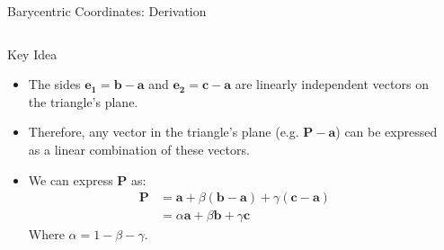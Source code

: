\begin{frame}{Barycentric Coordinates: Derivation}
    \begin{columns}
        \begin{column}{0.65\textwidth}
            \begin{mathbox}{Key Idea}
                \begin{itemize}
                    \item  The sides
                        $\mathbf{e_1} = \mathbf{b} - \mathbf{a}$ and $\mathbf{e_2} = \mathbf{c} - \mathbf{a}$ are linearly independent vectors on the triangle's plane.
                    \pause
                    \item Therefore, any vector in the triangle's plane (e.g. $\mathbf{P} - \mathbf{a}$) can be expressed as a linear combination of these vectors.
                    \pause
                    \item We can express $\mathbf{P}$ as:
                        \begin{align*}
                            \mathbf{P} &= \mathbf{a} + \beta(\mathbf{b}-\mathbf{a}) + \gamma(\mathbf{c}-\mathbf{a}) \\
                            &= \alpha \mathbf{a} + \beta \mathbf{b} + \gamma \mathbf{c}
                        \end{align*}
                        Where $\alpha = 1 - \beta - \gamma$.
                \end{itemize}
            \end{mathbox}
           
            

        \end{column}
        \begin{column}{0.35\textwidth}
\end{column}
\end{columns}
\end{frame}
